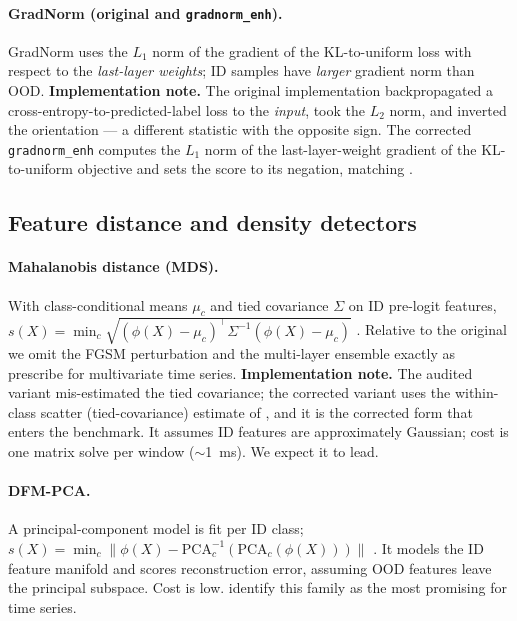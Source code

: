 \documentclass[11pt]{article}
\begin{document}
\paragraph{GradNorm (original and \texttt{gradnorm\_enh}).}
GradNorm \citep{Huang2021} uses the $L_1$ norm of the gradient of the
KL-to-uniform loss with respect to the \emph{last-layer weights}; ID samples have
\emph{larger} gradient norm than OOD. \textbf{Implementation note.} The original
implementation backpropagated a cross-entropy-to-predicted-label loss to the
\emph{input}, took the $L_2$ norm, and inverted the orientation --- a different
statistic with the opposite sign. The corrected \texttt{gradnorm\_enh} computes the
$L_1$ norm of the last-layer-weight gradient of the KL-to-uniform objective and sets
the score to its negation, matching \citet{Huang2021}.

\subsection{Feature distance and density detectors}\label{sec:m-feature}

\paragraph{Mahalanobis distance (MDS).}
With class-conditional means $\mu_c$ and tied covariance $\Sigma$ on ID pre-logit
features, $s(X) = \min_c \sqrt{(\phi(X)-\mu_c)^\top \Sigma^{-1}(\phi(X)-\mu_c)}$
\citep{Lee2018}. Relative to the original we omit the FGSM perturbation and the
multi-layer ensemble exactly as \citet{Gungor2025} prescribe for multivariate time
series. \textbf{Implementation note.} The audited variant mis-estimated the tied
covariance; the corrected variant uses the within-class scatter (tied-covariance)
estimate of \citet{Lee2018}, and it is the corrected form that enters the benchmark.
It assumes ID features are approximately Gaussian; cost is one matrix solve per
window ($\sim$\SI{1}{\milli\second}). We expect it to lead.

\paragraph{DFM-PCA.}
A principal-component model is fit per ID class; $s(X) = \min_c \lVert \phi(X) -
\mathrm{PCA}_c^{-1}(\mathrm{PCA}_c(\phi(X))) \rVert$ \citep{Ahuja2019}. It models the
ID feature manifold and scores reconstruction error, assuming OOD features leave the
principal subspace. Cost is low. \citet{Gungor2025} identify this family as the most
promising for time series.
\end{document}

